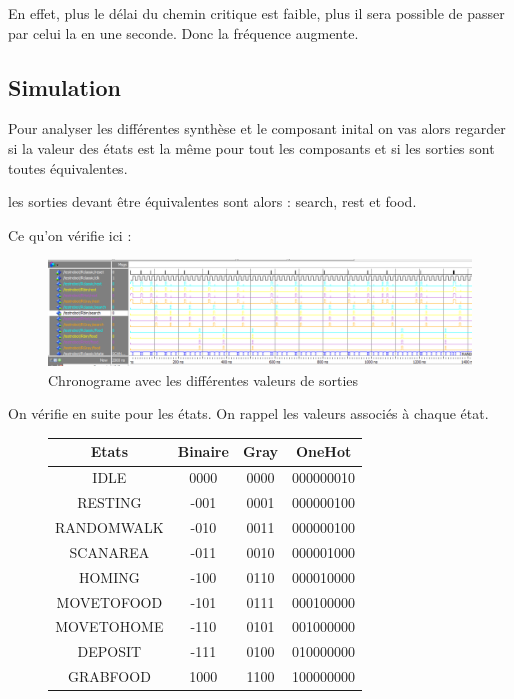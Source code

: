 \documentclass{article}
\begin{document}
En effet, plus le délai du chemin critique est faible, plus il sera possible de passer par celui la en une seconde. Donc la fréquence augmente.
\begin{landscape}
\newpage
\section{Simulation}
Pour analyser les différentes synthèse et le composant inital on vas alors regarder si la valeur des états est la même pour tout les composants et si les sorties sont toutes équivalentes.

les sorties devant être équivalentes sont alors : search, rest et food.

Ce qu'on vérifie ici :

\begin{figure}[!h]
\centering
\includegraphics[scale=0.6]{C/OUTPUT_OK.PNG}
\caption{Chronograme avec les différentes valeurs de sorties }
\end{figure} 


On vérifie en suite pour les états.
On rappel les valeurs associés à chaque état.
\begin{figure}[!h]
\centering
\begin{tabular}{c | c | c | c}
	
	Etats & Binaire  & Gray  & OneHot   \\
\hline	
   IDLE & 0000 & 0000 &    000000010\\
   RESTING & -001 & 0001 & 000000100 \\
   RANDOMWALK & -010 & 0011 &  000000100 \\
   SCANAREA & -011 & 0010 & 000001000 \\
   HOMING & -100 &0110   & 000010000 \\ 
   MOVETOFOOD & -101&0111 &000100000 \\
   MOVETOHOME & -110 &0101&001000000 \\
   DEPOSIT & -111 & 0100 & 010000000 \\
   GRABFOOD & 1000& 1100  &100000000\\   
 \end{tabular}


\end{figure}
\end{landscape}
\end{document}
